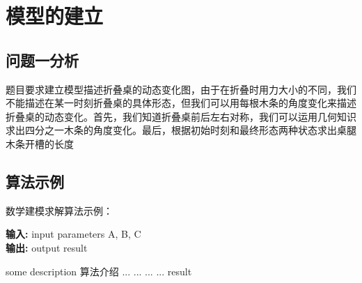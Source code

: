 \section{模型的建立}

\subsection{问题一分析}
题目要求建立模型描述折叠桌的动态变化图，由于在折叠时用力大小的不同，我们不能描述在某一时刻折叠桌的具体形态，但我们可以用每根木条的角度变化来描述折叠桌的动态变化。首先，我们知道折叠桌前后左右对称，我们可以运用几何知识求出四分之一木条的角度变化。最后，根据初始时刻和最终形态两种状态求出桌腿木条开槽的长度


\subsection{算法示例}

数学建模求解算法示例：
\begin{center}
\begin{minipage}{0.8\textwidth}
\begin{algorithm}[H]%
\caption{算法的名字} %
{\bf 输入:} %
input parameters A, B, C\\
{\bf 输出:} %
output result
\begin{algorithmic}[1]
\State some description 算法介绍 %
  \State ...
    \State ...
  \Else
    \State ...
  \EndIf
\EndFor
{} %
  \State ...
\EndWhile
\State \Return result
\end{algorithmic}
\end{algorithm}
\end{minipage}
\end{center}
\vspace{2ex}
